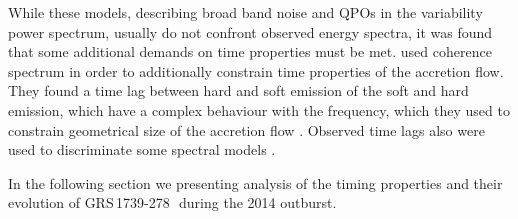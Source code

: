 \documentclass[a4paper,fleqn,usenatbib]{mnras}
\def\grs{{GRS\,1739-278\,}}
\begin{document}
While these models, describing broad band noise and QPOs in the variability power spectrum, usually do not confront observed energy spectra, it was found that some additional demands on time properties must be met.
\citet{1997ApJ...474L..43V} used coherence spectrum in order to additionally constrain time properties of the accretion flow. 
They found a time lag between hard and soft emission of the soft and hard emission, which have a complex behaviour with the frequency, which they used to constrain geometrical size of the accretion flow \citep{1999ApJ...517..355N}. 
Observed time lags also were used to discriminate some spectral models \citep[see, e.g.,][]{2001MNRAS.327..799K}.

In the following section we presenting analysis of the timing properties and their evolution of \grs\ during the 2014 outburst.
\end{document}
